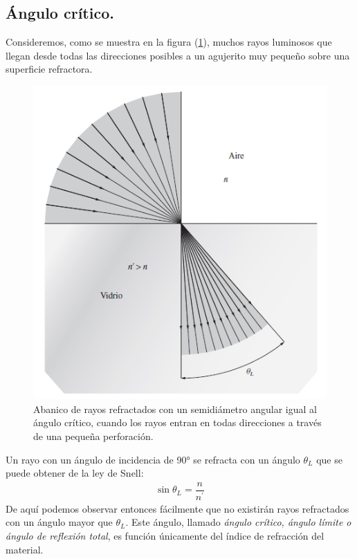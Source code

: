 \documentclass[14pt]{extarticle}
\begin{document}
\subsection{Ángulo crítico.}

Consideremos, como se muestra en la figura (\ref{fig:figura_05}), muchos rayos luminosos que llegan desde todas las direcciones posibles a un agujerito muy pequeño sobre una superficie refractora.
\begin{figure}[H]
\centering
\includegraphics[scale=0.75]{Imagenes/Optica_Geometrica_05.png}
\caption{Abanico de rayos refractados con un semidiámetro angular igual al ángulo crítico, cuando los rayos entran en todas direcciones a través de una pequeña perforación.}
\label{fig:figura_05}
\end{figure}
Un rayo con un ángulo de incidencia de \ang{90} se refracta con un ángulo $\theta_{L}$ que se puede obtener de la ley de Snell:
\begin{align}
\sin \theta_{L} = \dfrac{n}{n^{\prime}}
\label{eq:ecuacion_I_19}
\end{align}
De aquí podemos observar entonces fácilmente que no existirán rayos refractados con un ángulo mayor que $\theta_{L}$. Este ángulo, llamado \textit{ángulo crítico, ángulo límite o ángulo de reflexión total}, es función únicamente del índice de refracción del material.
\end{document}
